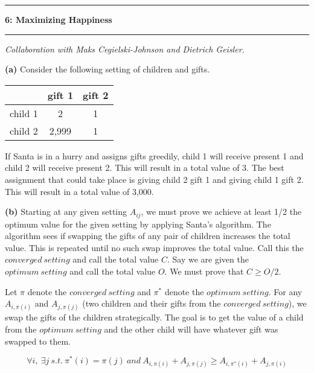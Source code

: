 \documentclass[11pt]{article}
\newcommand\question[2]{\vspace{.25in}\hrule\textbf{#1: #2}\vspace{.5em}\hrule\vspace{.10in}}
\renewcommand\part[1]{\vspace{.10in}\textbf{(#1)}}
\begin{document}

\question{6}{Maximizing Happiness}
\textit{Collaboration with Maks Cegielski-Johnson and Dietrich Geisler.}

\part{a} Consider the following setting of children and gifts.

\begin{table}[H]
\centering
{\renewcommand{\arraystretch}{1.2}%
\begin{tabular}{| c | c | c |}
\hline
& gift 1 & gift 2 \\ \hline
child 1 & 2& 1 \\ \hline
child 2 & 2,999& 1\\ \hline
\end{tabular}}
\end{table}

If Santa is in a hurry and assigns gifts greedily, child 1 will receive present 1 and child 2 will receive present 2. This will result in a total value of 3. The best assignment that could take place is giving child 2 gift 1 and giving child 1 gift 2. This will result in a total value of 3,000. 

\part{b} 
Starting at any given setting $A_{ij}$, we must prove we achieve at least 1/2 the optimum value for the given setting by applying Santa's algorithm. The algorithm sees if swapping the gifts of any pair of children increases the total value. This is repeated until no such swap improves the total value. Call this the $converged \ setting$ and call the total value $C$. Say we are given the $optimum \ setting$ and call the total value $O$. We must prove that $C \geq O/2$.

Let $\pi$ denote the $converged \ setting$ and $\pi^*$ denote the $optimum \ setting$. For any $A_{i, \pi(i)}$ and $A_{j, \pi(j)}$ (two children and their gifts from the $converged \ setting$), we swap the gifts of the children strategically. The goal is to get the value of a child from the  $optimum \ setting$ and the other child will have whatever gift was swapped to them.

	{\large $$\forall i, \ \exists j \ s.t. \ \pi^*(i) = \pi(j) \ and \ A_{i, \pi(i)} + A_{j, \pi(j)} \geq A_{i, \pi^*(i)} + A_{j, \pi(i)}$$}
	
\end{document}
